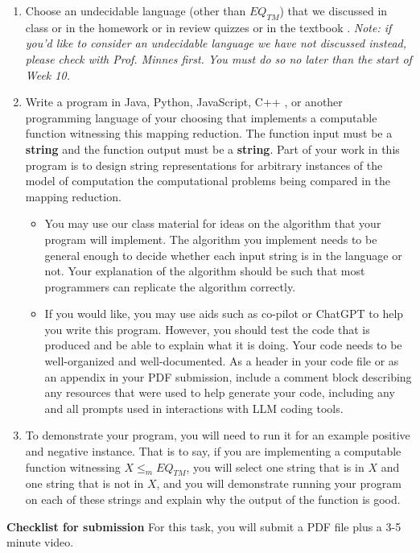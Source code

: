 \documentclass[12pt, oneside]{article}
\begin{document}
\begin{enumerate}
\item Choose an undecidable language (other than $EQ_{TM}$) that 
we discussed in class or in the homework
or in review quizzes or in the textbook . {\it Note:
if you'd like to consider an undecidable language we have not discussed instead, 
please check with Prof. Minnes first. 
You must do so no later than the start of Week 10.}
\item Write a program in Java, Python, JavaScript, C++ , or another programming language of your choosing that implements a computable function witnessing this mapping reduction.  The function input must be a {\bf string}  and the function 
output must be a {\bf string}. Part of your work in this program 
is to design string representations for arbitrary instances of the model of 
computation the computational problems being compared in the mapping reduction.
\begin{itemize}
   \item You may use our class material for ideas on the algorithm that your program will implement. The algorithm you implement needs to be general enough to decide whether each input string is in the language or not. Your explanation of the algorithm should be such that most programmers can replicate the algorithm correctly.
   \item If you would like, you may use aids such as co-pilot or ChatGPT to help you write this program. 
   However, you should test the code that is produced and be able to explain what it is doing. Your code needs to be well-organized and well-documented.
   As a header in your code file or as an appendix in your PDF submission, include a comment block describing any resources that were used to 
   help generate your code, including any and all prompts used in interactions 
   with LLM coding tools.
\end{itemize}

\item To demonstrate your program, you will need to run it for an example positive and negative instance. That is to say, if you are implementing 
a computable function witnessing $X \leq_m EQ_{TM}$, you will select one string that is in $X$ and one string that is not in $X$, and you will 
 demonstrate running your program on each of these strings and explain why 
 the output of the function is good.
\end{enumerate}

\newpage

{\bf Checklist for submission} For this task, you will submit a PDF file plus a 3-5 minute video.
\end{document}
